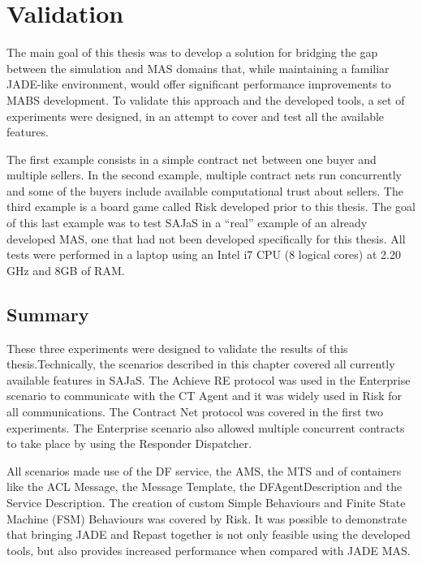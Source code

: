 \chapter{Validation}
\label{chap:validation}

The main goal of this thesis was to develop a solution for bridging the gap between the simulation and MAS domains that, while maintaining a familiar JADE-like environment, would offer significant performance improvements to MABS development. To validate this approach and the developed tools, a set of experiments were designed, in an attempt to cover and test all the available features.

The first example consists in a simple contract net between one buyer and multiple sellers. In the second example, multiple contract nets run concurrently and some of the buyers include available computational trust about sellers. The third example is a board game called Risk developed prior to this thesis. The goal of this last example was to test SAJaS in a ``real'' example of an already developed MAS, one that had not been developed specifically for this thesis. All tests were performed in a laptop using an Intel i7 CPU (8 logical cores) at 2.20 GHz and 8GB of RAM.








\section{Summary}

These three experiments were designed to validate the results of this thesis.Technically, the scenarios described in this chapter covered all currently available features in SAJaS. The Achieve RE protocol was used in the Enterprise scenario to communicate with the CT Agent and it was widely used in Risk for all communications. The Contract Net protocol was covered in the first two experiments. The Enterprise scenario also allowed multiple concurrent contracts to take place by using the Responder Dispatcher.

All scenarios made use of the DF service, the AMS, the MTS and of containers like the ACL Message, the Message Template, the DFAgentDescription and the Service Description. The creation of custom Simple Behaviours and Finite State Machine (FSM) Behaviours was covered by Risk. It was possible to demonstrate that bringing JADE and Repast together is not only feasible using the developed tools, but also provides increased performance when compared with JADE MAS.


